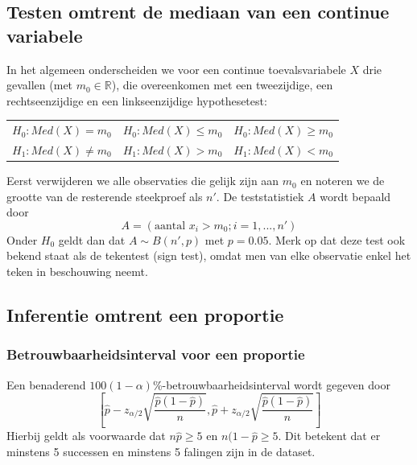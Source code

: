 \documentclass[titlepage]{article}
\numberwithin{equation}{section}
\begin{document}
\subsection{Testen omtrent de mediaan van een continue variabele}
In het algemeen onderscheiden we voor een continue toevalsvariabele $X$ drie gevallen (met $m_0 \in \mathbb{R}$), die overeenkomen met een tweezijdige, een rechtseenzijdige en een linkseenzijdige hypothesetest:
\begin{table}[H]
\centering
\begin{tabular}{lll}
 $H_0: Med(X) = m_0$ & $H_0: Med(X) \leq m_0$ &  $H_0: Med(X) \geq m_0$\\
 $H_1: Med(X) \neq m_0$ & $H_1: Med(X) > m_0$ & $H_1: Med(X) < m_0$
\end{tabular}
\end{table}
Eerst verwijderen we alle observaties die gelijk zijn aan $m_0$ en noteren we de grootte van de resterende steekproef als $n'$. De teststatistiek $A$ wordt bepaald door
\begin{equation*}
	A = ( \text{aantal } x_i > m_0 ; i = 1, ... , n')
\end{equation*}
Onder $H_0$ geldt dan dat $A \sim B(n', p)$ met $p = 0.05$.\newline\newline
\danger Merk op dat deze test ook bekend staat als de tekentest (sign test), omdat men van elke observatie enkel het teken in beschouwing neemt.\newpage
\subsection{Inferentie omtrent een proportie}
\subsubsection{Betrouwbaarheidsinterval voor een proportie}
Een benaderend $100(1-\alpha)$\%-betrouwbaarheidsinterval wordt gegeven door
\begin{equation}
	\left[ \hat{p} - z_{\alpha/2} \sqrt{\frac{\hat{p}(1-\hat{p})}{n}}, \hat{p} + z_{\alpha/2} \sqrt{\frac{\hat{p}(1-\hat{p})}{n}} \right]
	\label{6.22}
\end{equation} 
Hierbij geldt als voorwaarde dat $n\hat{p}\geq5$ en $n(1-\hat{p}\geq5$. Dit betekent dat er minstens 5 successen en minstens 5 falingen zijn in de dataset.
\end{document}
